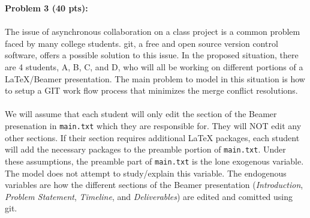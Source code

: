 \documentclass[12pt]{article}
\begin{document}
\newpage
\noindent\textbf{Problem 3 (40 pts):}

\paragraph{} The issue of asynchronous collaboration on a class project is a common problem faced by many college students. git, a free and open source version control software, offers a possible solution to this issue. In the proposed situation, there are 4 students, A, B, C, and D, who will all be working on different portions of a LaTeX/Beamer presentation. The main problem to model in this situation is how to setup a GIT work flow process that minimizes the merge conflict resolutions. 

\paragraph{}We will assume that each student will only edit the section of the Beamer presenation in \texttt{main.txt} which they are responsible for. They will NOT edit any other sections. If their section requires additional LaTeX packages, each student will add the necessary packages to the preamble portion of \texttt{main.txt}. Under these assumptions, the preamble part of \texttt{main.txt} is the lone exogenous variable. The model does not attempt to study/explain this variable. The endogenous variables are how the different sections of the Beamer presentation (\emph{Introduction}, \emph{Problem Statement}, \emph{Timeline}, and \emph{Deliverables}) are edited and comitted using git. 
\end{document}

